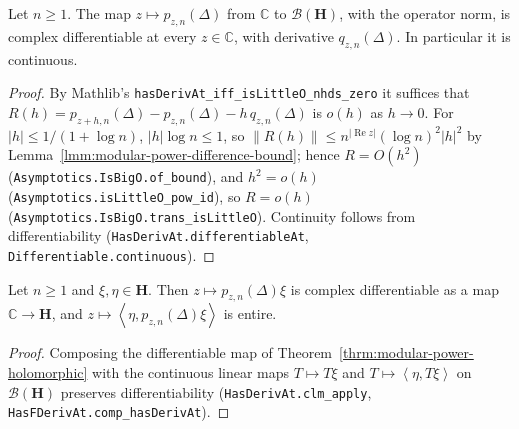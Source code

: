 \begin{theorem}
    \label{thrm:modular-power-holomorphic}
    \leanok
    Let $n \ge 1$. The map $z \mapsto p_{z,n}(\Delta)$ from $\mathbb{C}$ to $\mathcal{B}(\mathbf{H})$, with the operator norm, is complex differentiable at every $z \in \mathbb{C}$, with derivative $q_{z,n}(\Delta)$. In particular it is continuous.
\end{theorem}
\begin{proof}
    \leanok
    By Mathlib's \texttt{hasDerivAt\_iff\_isLittleO\_nhds\_zero} it suffices that $R(h) = p_{z+h,n}(\Delta) - p_{z,n}(\Delta) - h\,q_{z,n}(\Delta)$ is $o(h)$ as $h \to 0$. For $|h| \le 1/(1 + \log n)$, $|h|\log n \le 1$, so $\|R(h)\| \le n^{|\operatorname{Re} z|}(\log n)^2 |h|^2$ by Lemma~\ref{lmm:modular-power-difference-bound}; hence $R = O(h^2)$ (\texttt{Asymptotics.IsBigO.of\_bound}), and $h^2 = o(h)$ (\texttt{Asymptotics.isLittleO\_pow\_id}), so $R = o(h)$ (\texttt{Asymptotics.IsBigO.trans\_isLittleO}). Continuity follows from differentiability (\texttt{HasDerivAt.differentiableAt}, \texttt{Differentiable.continuous}).
\end{proof}

\begin{corollary}
    \label{crllr:modular-power-vector-entire}
    \leanok
    Let $n \ge 1$ and $\xi, \eta \in \mathbf{H}$. Then $z \mapsto p_{z,n}(\Delta)\xi$ is complex differentiable as a map $\mathbb{C} \to \mathbf{H}$, and $z \mapsto \left< \eta, p_{z,n}(\Delta)\xi \right>$ is entire.
\end{corollary}
\begin{proof}
    \leanok
    Composing the differentiable map of Theorem~\ref{thrm:modular-power-holomorphic} with the continuous linear maps $T \mapsto T\xi$ and $T \mapsto \left< \eta, T\xi \right>$ on $\mathcal{B}(\mathbf{H})$ preserves differentiability (\texttt{HasDerivAt.clm\_apply}, \texttt{HasFDerivAt.comp\_hasDerivAt}).
\end{proof}

